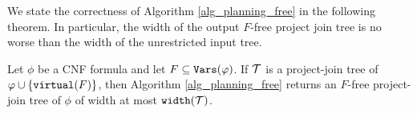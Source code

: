 
We state the correctness of Algorithm \ref{alg_planning_free} in the following theorem. In particular, the width of the output $F$-free project join tree is no worse than the width of the unrestricted input tree.
\begin{theorem}\label{thm:planning_free_correctness}
Let $\phi$ be a CNF formula and let $F \subseteq \texttt{\upshape Vars}(\varphi)$. 
If $\mathcal{T}$ is a project-join tree of $\varphi \cup \{\texttt{\upshape virtual}(F)\}$, then Algorithm \ref{alg_planning_free} returns an $F$-free project-join tree of $\phi$ of width at most $\texttt{\upshape width}(\mathcal{T})$.
\end{theorem}


